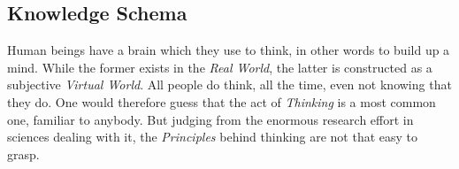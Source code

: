 %
%
%
%
%
%
%

\subsection{Knowledge Schema}
\label{knowledge_schema_heading}

Human beings have a brain which they use to think, in other words to build up a
mind. While the former exists in the \emph{Real World}, the latter is
constructed as a subjective \emph{Virtual World}. All people do think, all the
time, even not knowing that they do. One would therefore guess that the act of
\emph{Thinking} is a most common one, familiar to anybody. But judging from the
enormous research effort in sciences dealing with it, the \emph{Principles}
behind thinking are not that easy to grasp.






